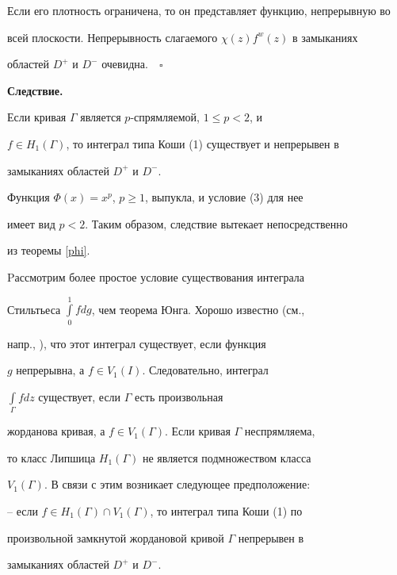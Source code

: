 Если его плотность ограничена, то он представляет функцию, непрерывную во


всей плоскости. Непрерывность слагаемого $\chi (z)f^{w}(z)$ в замыканиях


областей $D^+$ и $D^-$ очевидна.$\quad\square$


\medskip





{\bf Следствие.}


Если кривая $\Gamma$ является $p$-спрямляемой, $1\le p<2$, и


$f\in H_{1}(\Gamma)$, то интеграл типа Коши (1) существует и непрерывен в


замыканиях областей $D^+$ и $D^-$.


\medskip





Функция $\Phi (x) = x^p$, $p\ge 1$, выпукла, и условие (3) для нее


имеет вид $p<2.$ Таким образом, следствие вытекает непосредственно


из теоремы \ref{phi}.





Pассмотрим более простое условие существования интеграла


Стильтьеса $\int\limits_0^1{fdg}$, чем теорема Юнга. Хорошо известно (см.,


напр., \cite{R}), что этот интеграл существует, если функция


$g$ непрерывна, а $f\in V_{1}(I)$. Следовательно, интеграл


$\int\limits_{\Gamma}{fdz}$ существует, если $\Gamma$ есть произвольная


жорданова кривая, а $f\in V_{1}(\Gamma)$. Если кривая $\Gamma$ неспрямляема,


то класс Липшица $H_{1}(\Gamma)$ не является подмножеством класса


$V_{1}(\Gamma)$. В связи с этим возникает следующее предположение:





-- если $f\in H_{1}(\Gamma)\cap V_{1}(\Gamma)$, то интеграл типа Коши (1) по


произвольной замкнутой жордановой кривой $\Gamma$ непрерывен в


замыканиях областей $D^+$ и $D^-$.





